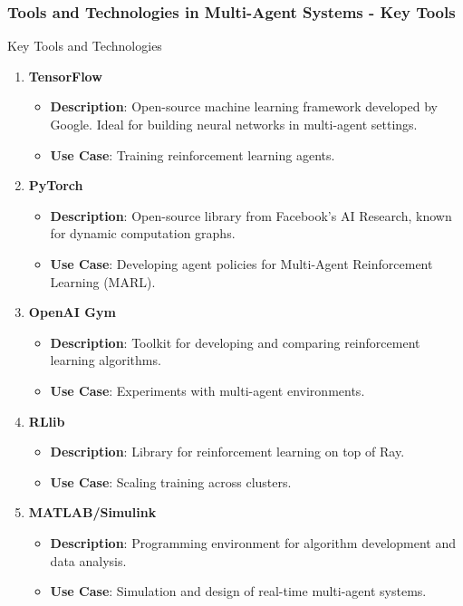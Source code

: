 \documentclass[aspectratio=169]{beamer}
\begin{document}
\begin{frame}[fragile]
    \frametitle{Tools and Technologies in Multi-Agent Systems - Key Tools}
    \begin{block}{Key Tools and Technologies}
        \begin{enumerate}
            \item \textbf{TensorFlow}  
                \begin{itemize}
                    \item \textbf{Description}: Open-source machine learning framework developed by Google. Ideal for building neural networks in multi-agent settings.
                    \item \textbf{Use Case}: Training reinforcement learning agents.
                \end{itemize}
                
            \item \textbf{PyTorch}  
                \begin{itemize}
                    \item \textbf{Description}: Open-source library from Facebook's AI Research, known for dynamic computation graphs.
                    \item \textbf{Use Case}: Developing agent policies for Multi-Agent Reinforcement Learning (MARL).
                \end{itemize}
                
            \item \textbf{OpenAI Gym}  
                \begin{itemize}
                    \item \textbf{Description}: Toolkit for developing and comparing reinforcement learning algorithms.
                    \item \textbf{Use Case}: Experiments with multi-agent environments.
                \end{itemize}
                
            \item \textbf{RLlib}  
                \begin{itemize}
                    \item \textbf{Description}: Library for reinforcement learning on top of Ray.
                    \item \textbf{Use Case}: Scaling training across clusters.
                \end{itemize}
                
            \item \textbf{MATLAB/Simulink}  
                \begin{itemize}
                    \item \textbf{Description}: Programming environment for algorithm development and data analysis.
                    \item \textbf{Use Case}: Simulation and design of real-time multi-agent systems.
                \end{itemize}
        \end{enumerate}
    \end{block}
\end{frame}
\end{document}

